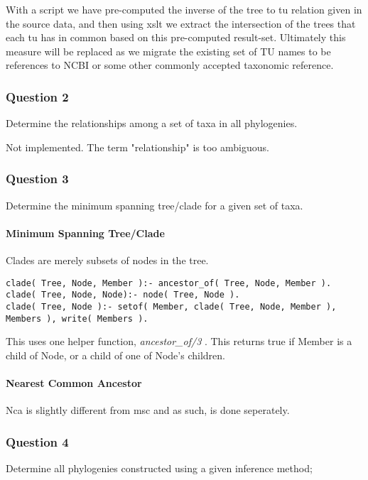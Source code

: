 \documentclass[10pt]{article}
\begin{document}
With a script we have pre-computed the inverse of the tree to tu relation given
in the source data, and then using xslt we extract the intersection of the
trees that each tu has in common based on this pre-computed result-set.
Ultimately this measure will be replaced as we migrate the existing set of TU
names to be references to NCBI or some other commonly accepted taxonomic
reference.


\subsubsection{Question 2}
Determine the relationships among a set of taxa in all phylogenies.

Not implemented.  The term "relationship" is too ambiguous.

\subsubsection{Question 3}
Determine the minimum spanning tree/clade for a given set of taxa.

\paragraph{Minimum Spanning Tree/Clade}

Clades are merely subsets of nodes in the tree.

\begin{verbatim}
clade( Tree, Node, Member ):- ancestor_of( Tree, Node, Member ).
clade( Tree, Node, Node):- node( Tree, Node ).
clade( Tree, Node ):- setof( Member, clade( Tree, Node, Member ), Members ), write( Members ).
\end{verbatim}

This uses one helper function, \emph{ ancestor\_of/3 }.  This returns true if
Member is a child of Node, or a child of one of Node's children.

\paragraph{Nearest Common Ancestor}

Nca is slightly different from msc and as such, is done seperately.

\subsubsection{Question 4}
Determine all phylogenies constructed using a given inference method;
\end{document}
